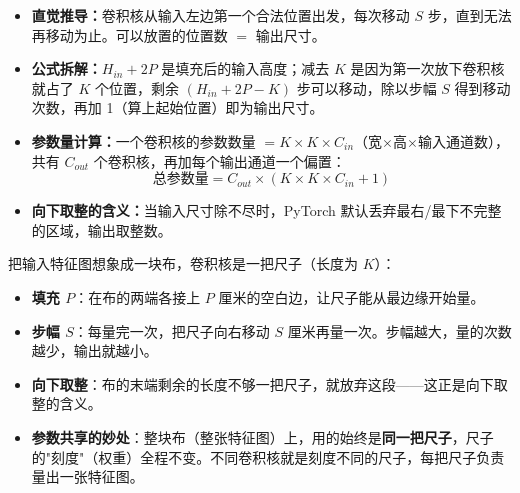\documentclass[a4paper,11pt]{ctexart}
\begin{document}
\begin{beginnerbox}
    \begin{itemize}
        \item \textbf{直觉推导：}卷积核从输入左边第一个合法位置出发，每次移动 $S$ 步，直到无法再移动为止。可以放置的位置数 $=$ 输出尺寸。
        \item \textbf{公式拆解：}$H_{in} + 2P$ 是填充后的输入高度；减去 $K$ 是因为第一次放下卷积核就占了 $K$ 个位置，剩余 $(H_{in}+2P-K)$ 步可以移动，除以步幅 $S$ 得到移动次数，再加 1（算上起始位置）即为输出尺寸。
        \item \textbf{参数量计算：}一个卷积核的参数数量 $= K \times K \times C_{in}$（宽$\times$高$\times$输入通道数），共有 $C_{out}$ 个卷积核，再加每个输出通道一个偏置：
        \begin{equation}
            \text{总参数量} = C_{out} \times (K \times K \times C_{in} + 1)
        \end{equation}
        \item \textbf{向下取整的含义：}当输入尺寸除不尽时，PyTorch 默认丢弃最右/最下不完整的区域，输出取整数。
    \end{itemize}
\end{beginnerbox}

\begin{metaphorbox}
    把输入特征图想象成一块布，卷积核是一把尺子（长度为 $K$）：

    \begin{itemize}
        \item \textbf{填充 $P$}：在布的两端各接上 $P$ 厘米的空白边，让尺子能从最边缘开始量。
        \item \textbf{步幅 $S$}：每量完一次，把尺子向右移动 $S$ 厘米再量一次。步幅越大，量的次数越少，输出就越小。
        \item \textbf{向下取整}：布的末端剩余的长度不够一把尺子，就放弃这段——这正是向下取整的含义。
        \item \textbf{参数共享的妙处}：整块布（整张特征图）上，用的始终是\textbf{同一把尺子}，尺子的"刻度"（权重）全程不变。不同卷积核就是刻度不同的尺子，每把尺子负责量出一张特征图。
    \end{itemize}
\end{metaphorbox}
\end{document}
